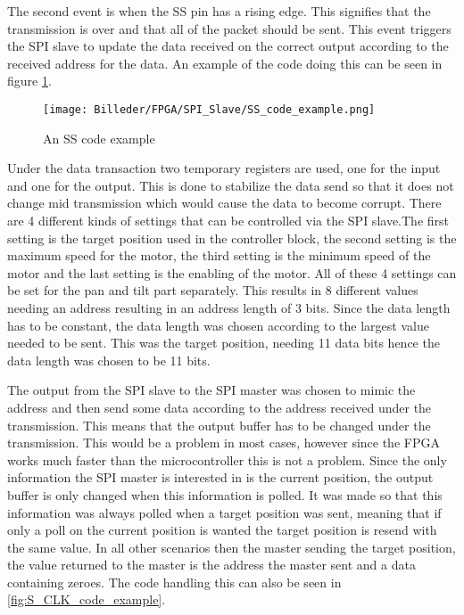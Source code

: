 \newpage

The second event is when the SS pin has a rising edge. This signifies that the transmission is over and that all of the packet should be sent. This event triggers the SPI slave to update the data received on the correct output according to the received address for the data. An example of the code doing this can be seen in figure \ref{fig:SS_code_example}.

\begin{figure}[h!]
\centering
\texttt{[image: Billeder/FPGA/SPI\_Slave/SS\_code\_example.png]}
\caption{ An SS code example }
\label{fig:SS_code_example}
\end{figure}

Under the data transaction two temporary registers are used, one for the input and one for the output. This is done to stabilize the data send so that it does not change mid transmission which would cause the data to become corrupt.
There are 4 different kinds of settings that can be controlled via the SPI slave.The first setting is the target position used in the controller block, the second setting is the maximum speed for the motor, the third setting is the minimum speed of the motor and the last setting is the enabling of the motor. All of these 4  settings can be set for the pan and tilt part separately. This results in 8 different values needing an address resulting in an address length of 3 bits.
Since the data length has to be constant, the data length was chosen according to the largest value needed to be sent. This was the target position, needing 11 data bits hence the data length was chosen to be 11 bits. 

The output from the SPI slave to the SPI master was chosen to mimic the address and then send some data according to the address received under the transmission. This means that the output buffer has to be changed under the transmission. This would be a problem in most cases, however since the FPGA works much faster than the microcontroller this is not a problem. Since the only information the SPI master is interested in is the current position, the output buffer is only changed when this information is polled. It was made so that this information was always polled when a target position was sent, meaning that if only a poll on the current position is wanted the target position is resend with the same value. In all other scenarios then the master sending the target position, the value returned to the master is the address the master sent and a data containing zeroes. The code handling this can also be seen in \ref{fig:S_CLK_code_example}.

